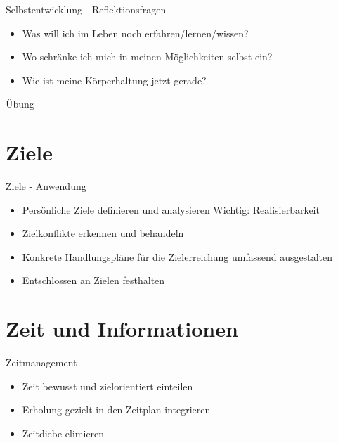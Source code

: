 \begin{frame}[c]{Selbstentwicklung - Reflektionsfragen}
    \begin{itemize}
    \item Was will ich im Leben noch erfahren/lernen/wissen? \newline
    \pause
    \item Wo schränke ich mich in meinen Möglichkeiten selbst ein? \newline
    \pause
    \item Wie ist meine Körperhaltung jetzt gerade?
    \end{itemize}
\end{frame}


\begin{frame}[standout]
    Übung
\end{frame}





\section{Ziele}

\begin{frame}[c]{Ziele - Anwendung}
    \begin{itemize}
    \item Persönliche Ziele definieren und analysieren \pause Wichtig: Realisierbarkeit
    \pause
    \item Zielkonflikte erkennen und behandeln
    \pause
    \item Konkrete Handlungspläne für die Zielerreichung umfassend ausgestalten
    \pause
    \item Entschlossen an Zielen festhalten
    \end{itemize}
\end{frame}





\section{Zeit und Informationen}

\begin{frame}[c]{Zeitmanagement}
    \begin{itemize}
    \item Zeit bewusst und zielorientiert einteilen \newline
    \pause
    \item Erholung gezielt in den Zeitplan integrieren \newline
    \pause
    \item Zeitdiebe elimieren
    \end{itemize}
\end{frame}



